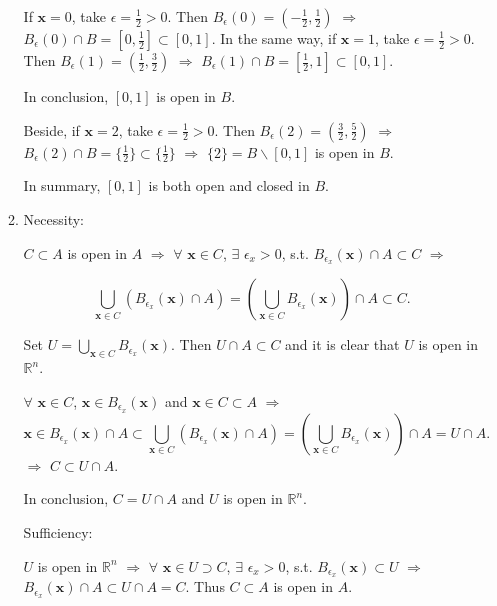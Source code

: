 \documentclass[11pt,letter,notitlepage]{article}
\theoremstyle{definition}
\begin{document}
\begin{solution}
\begin{enumerate}
\begin{enumerate}
		If $\mathbf{x} = 0$, take $\epsilon = \frac{1}{2} > 0$. Then $B_{\epsilon}(0) = (-\frac{1}{2}, \frac{1}{2})$ $\Longrightarrow$ $B_{\epsilon}(0) \cap B = [0, \frac{1}{2}] \subset [0,1]$. In the same way, if $\mathbf{x} = 1$, take $\epsilon = \frac{1}{2} > 0$. Then $B_{\epsilon}(1) = (\frac{1}{2}, \frac{3}{2})$ $\Longrightarrow$ $B_{\epsilon}(1) \cap B = [\frac{1}{2}, 1] \subset [0,1]$.

		In conclusion, $[0,1]$ is open in $B$.

		Beside, if $\mathbf{x} = 2$, take $\epsilon = \frac{1}{2} > 0$. Then $B_{\epsilon}(2) = (\frac{3}{2}, \frac{5}{2})$ $\Longrightarrow$ $B_{\epsilon}(2) \cap B = \{\frac{1}{2}\} \subset \{\frac{1}{2}\}$ $\Longrightarrow$ $\{2\} = B \backslash [0,1]$ is open in $B$.

		In summary, $[0,1]$ is both open and closed in $B$.
		\item 
		 Necessity:

		$C \subset A$ is open in $A$ $\Longrightarrow$ $\forall$ $\mathbf{x} \in C$, $\exists$ $\epsilon_{x} > 0$, s.t. $B_{\epsilon_{x}}(\mathbf{x}) \cap A \subset C$ $\Longrightarrow$

		$$\bigcup\limits_{\mathbf{x} \in C} \left(B_{\epsilon_{x}}(\mathbf{x}) \cap A\right) = \left(\bigcup\limits_{\mathbf{x} \in C} B_{\epsilon_{x}}(\mathbf{x})\right) \cap A \subset C.$$
		
		Set $U = \bigcup\limits_{\mathbf{x} \in C} B_{\epsilon_{x}}(\mathbf{x})$. Then $U \cap A \subset C$ and it is clear that $U$ is open in $\mathbb{R}^n$.

		$\forall$ $\mathbf{x} \in C$, $\mathbf{x} \in B_{\epsilon_x}(\mathbf{x})$ and $\mathbf{x} \in C \subset A$ $\Longrightarrow$ 
		$$\mathbf{x} \in B_{\epsilon_x}(\mathbf{x}) \cap A \subset \bigcup\limits_{\mathbf{x} \in C} \left(B_{\epsilon_{x}}(\mathbf{x}) \cap A\right) = \left(\bigcup\limits_{\mathbf{x} \in C} B_{\epsilon_{x}}(\mathbf{x})\right) \cap A = U \cap A.$$
		$\Longrightarrow$ $C \subset U \cap A$.

		In conclusion, $C = U \cap A$ and $U$ is open in $\mathbb{R}^n$.
		
		 Sufficiency:

		$U$ is open in $\mathbb{R}^n$ $\Longrightarrow$ $\forall$ $\mathbf{x} \in U \supset C$, $\exists$ $\epsilon_x > 0$, s.t. $B_{\epsilon_x}(\mathbf{x}) \subset U$ $\Longrightarrow$ $B_{\epsilon_x}(\mathbf{x}) \cap A \subset U \cap A = C$. Thus $C \subset A$ is open in $A$.
	\end{enumerate}
\end{enumerate}
\end{solution}
\end{document}
